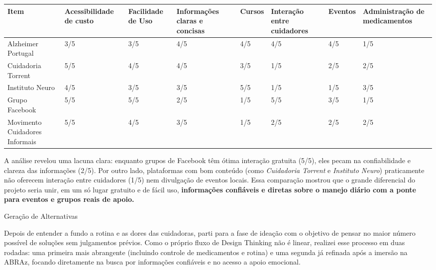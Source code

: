 \documentclass[11pt,a4paper]{article}
\newcommand{\subtituloSecao}[1]{%
  \par\addvspace{10pt}%
  {\noindent\fontsize{16pt}{20pt}\selectfont\normalfont\color{headingBlue}#1\par}%
  \vspace{3pt}%
}
\begin{document}
\begin{table}[H]
  \centering
  \footnotesize
  \setlength{\tabcolsep}{3pt}
  \renewcommand{\arraystretch}{1.35}
  \begin{tabular}{|L{2.0cm}|C{2.05cm}|C{1.4cm}|C{1.75cm}|C{1.05cm}|C{1.65cm}|C{1.05cm}|C{1.95cm}|}
    \hline
    \raggedright Item & \raggedright Acessibilidade de custo & \raggedright Facilidade de Uso & \raggedright Informações claras e concisas & \raggedright Cursos & \raggedright Interação entre cuidadores & \raggedright Eventos & \raggedright\arraybackslash Administração de medicamentos \\
    \hline
    Alzheimer Portugal & 3/5 & 3/5 & 4/5 & 4/5 & 4/5 & 4/5 & 1/5 \\
    \hline
    Cuidadoria Torrent & 5/5 & 4/5 & 4/5 & 3/5 & 1/5 & 2/5 & 2/5 \\
    \hline
    Instituto Neuro & 4/5 & 3/5 & 3/5 & 5/5 & 1/5 & 1/5 & 3/5 \\
    \hline
    Grupo Facebook & 5/5 & 5/5 & 2/5 & 1/5 & 5/5 & 3/5 & 1/5 \\
    \hline
    Movimento Cuidadores Informais & 5/5 & 4/5 & 3/5 & 1/5 & 2/5 & 2/5 & 2/5 \\
    \hline
  \end{tabular}
\end{table}

A análise revelou uma lacuna clara: enquanto grupos de Facebook têm ótima interação gratuita (5/5), eles pecam na confiabilidade e clareza das informações (2/5). Por outro lado, plataformas com bom conteúdo (como \textit{Cuidadoria Torrent} e \textit{Instituto Neuro}) praticamente não oferecem interação entre cuidadores (1/5) nem divulgação de eventos locais. Essa comparação mostrou que o grande diferencial do projeto seria unir, em um só lugar gratuito e de fácil uso, \textbf{informações confiáveis e diretas sobre o manejo diário com a ponte para eventos e grupos reais de apoio.}

\subtituloSecao{Geração de Alternativas}

Depois de entender a fundo a rotina e as dores das cuidadoras, parti para a fase de ideação com o objetivo de pensar no maior número possível de soluções sem julgamentos prévios. Como o próprio fluxo de Design Thinking não é linear, realizei esse processo em duas rodadas: uma primeira mais abrangente (incluindo controle de medicamentos e rotina) e uma segunda já refinada após a imersão na ABRAz, focando diretamente na busca por informações confiáveis e no acesso a apoio emocional.
\end{document}
